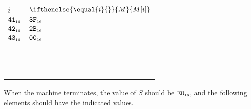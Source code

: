 \documentclass[a4paper,12pt]{article}
\makeatletter
\newcommand{\num}[1]{\texttt{#1}}
\newcommand{\hex}[1]{\num{#1}_{\textup{\tiny 16}}}
\newcommand{\MEM}[1]{\ifthenelse{\equal{#1}{}}{M}{M[#1]}}
\newcommand{\SP}{S}
\newenvironment{memtable}{%
  \begin{trivlist}
    \item
    }{%
    \end{trivlist}}
\newenvironment{memcolumn}{%
  \begin{tabular}{@{}ll@{}}
    $i$ & $\MEM{i}$ \\
    \hline}
    {%
  \end{tabular}}
\makeatother
\begin{document}
\begin{memtable}
\begin{memcolumn}
    $\hex{41}$ & $\hex{3F}$ \\
    $\hex{42}$ & $\hex{2B}$ \\
    $\hex{43}$ & $\hex{00}$ \\
    \\
    \\
    \\
    \\
    \\
    \\
    \\
    \\
    \\
    \\
    \\
    \\
  \end{memcolumn}
\end{memtable}
When the machine terminates, the value of $\SP$ should be $\hex{E0}$, and the following elements should have the indicated values.
\end{document}
